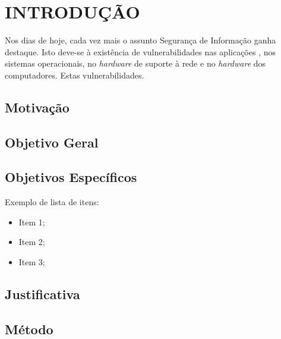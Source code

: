 \chapter{INTRODUÇÃO}
Nos dias de hoje, cada vez mais o assunto Segurança de Informação
ganha destaque. Isto deve-se à existência de vulnerabilidades nas
aplicações \cite{Io02}, nos sistemas operacionais, no \emph{hardware}
de suporte à rede e no \emph{hardware} dos computadores. Estas vulnerabilidades.


\section{Motivação}\label{mot}


\section{Objetivo Geral}\label{og}


\section{Objetivos Específicos}\label{oe}
Exemplo de lista de itens:
\begin{itemize}
 \item Item 1;
 \item Item 2;
 \item Item 3;
\end{itemize}


\section{Justificativa}\label{just}


\section{Método}\label{met}




